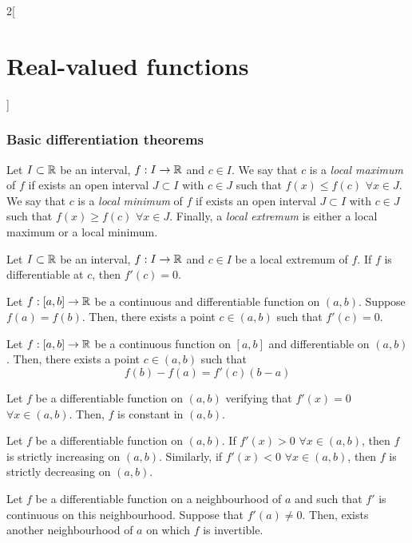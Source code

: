 \documentclass[../../../main.tex]{subfiles}
\begin{document}
\begin{multicols}{2}[\section{Real-valued functions}]
  \subsubsection{Basic differentiation theorems}
  \begin{definition}
    Let $I\subset\mathbb{R}$ be an interval, $f:I\rightarrow\mathbb{R}$ and $c\in I$. We say that $c$ is a \emph{local maximum} of $f$ if exists an open interval $J\subset I$ with $c\in J$ such that $f(x)\leq f(c)$ $\forall x\in J$. We say that $c$ is a \emph{local minimum} of $f$ if exists an open interval $J\subset I$ with $c\in J$ such that $f(x)\geq f(c)$ $\forall x\in J$. Finally, a \emph{local extremum} is either a local maximum or a local minimum.
  \end{definition}
  \begin{proposition}
    Let $I\subset\mathbb{R}$ be an interval, $f:I\rightarrow\mathbb{R}$ and $c\in I$ be a local extremum of $f$. If $f$ is differentiable at $c$, then $f'(c)=0$.
  \end{proposition}
  \begin{theorem}
    Let $f:[a,b]\rightarrow\mathbb{R}$ be a continuous and differentiable function on $(a,b)$. Suppose $f(a)=f(b)$. Then, there exists a point $c\in (a,b)$ such that $f'(c)=0$.
  \end{theorem}
  \begin{theorem}
    Let $f:[a,b]\rightarrow\mathbb{R}$ be a continuous function on $[a,b]$ and differentiable on $(a,b)$. Then, there exists a point $c\in (a,b)$ such that $$f(b)-f(a)=f'(c)(b-a)$$
  \end{theorem}
  \begin{corollary}
    Let $f$ be a differentiable function on $(a,b)$ verifying that $f'(x)=0$ $\forall x\in(a,b)$. Then, $f$ is constant in $(a,b)$.
  \end{corollary}
  \begin{corollary}
    Let $f$ be a differentiable function on $(a,b)$. If $f'(x)>0$ $\forall x\in(a,b)$, then $f$ is strictly increasing on $(a,b)$. Similarly, if $f'(x)<0$ $\forall x\in(a,b)$, then $f$ is strictly decreasing on $(a,b)$.
  \end{corollary}
  \begin{corollary}
    Let $f$ be a differentiable function on a neighbourhood of $a$ and such that $f'$ is continuous on this neighbourhood. Suppose that $f'(a)\ne0$. Then, exists another neighbourhood of $a$ on which $f$ is invertible.
  \end{corollary}
  \begin{theorem}

\end{theorem}
\end{multicols}
\end{document}
